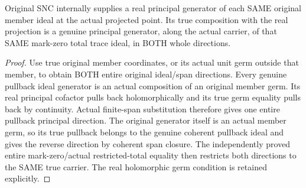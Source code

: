 \begin{lemma}
\label{hir:sharp-original-first-member-total-actual-relative-principal}
\leanok
Original SNC internally supplies a real principal generator of each SAME
original member ideal at the actual projected point. Its true composition
with the real projection is a genuine principal generator, along the actual
carrier, of that SAME mark-zero total trace ideal, in BOTH whole directions.
\end{lemma}
\begin{proof}
Use true original member coordinates, or its actual unit germ outside that
member, to obtain BOTH entire original ideal/span directions. Every genuine
pullback ideal generator is an actual composition of an original member germ.
Its real principal cofactor pulls back holomorphically and its true germ
equality pulls back by continuity. Actual finite-span substitution therefore
gives one entire pullback principal direction. The original generator itself
is an actual member germ, so its true pullback belongs to the genuine coherent
pullback ideal and gives the reverse direction by coherent span closure.
The independently proved entire mark-zero/actual restricted-total equality
then restricts both directions to the SAME true carrier. The real holomorphic
germ condition is retained explicitly.
\end{proof}

